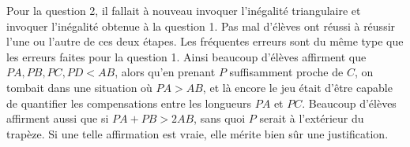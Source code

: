 Pour la question 2, il fallait à nouveau invoquer l'inégalité triangulaire et invoquer l'inégalité obtenue à la question 1. Pas mal d'élèves ont réussi à réussir l'une ou l'autre de ces deux étapes. Les fréquentes erreurs sont du même type que les erreurs faites pour la question 1. Ainsi beaucoup d'élèves affirment que $PA,PB,PC,PD<AB$, alors qu'en prenant $P$ suffisamment proche de $C$, on tombait dans une situation où $PA>AB$, et là encore le jeu était d'être capable de quantifier les compensations entre les longueurs $PA$ et $PC$. Beaucoup d'élèves affirment aussi que si $PA+PB>2AB$, sans quoi $P$ serait à l'extérieur du trapèze. Si une telle affirmation est vraie, elle mérite bien sûr une justification. 